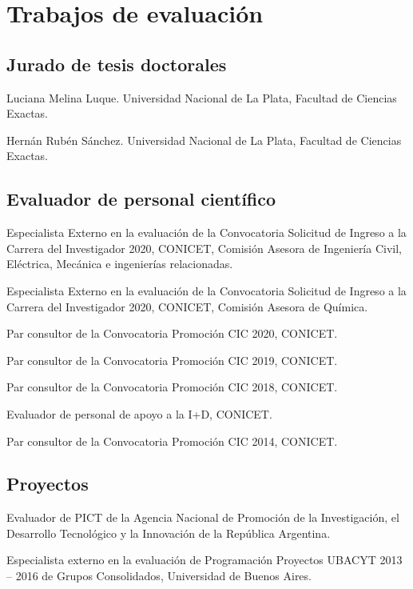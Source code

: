 \section{Trabajos de evaluación}

\subsection{Jurado de tesis doctorales}
 Luciana Melina Luque. Universidad Nacional de La Plata, Facultad de Ciencias Exactas.

 Hernán Rubén Sánchez. Universidad Nacional de La Plata, Facultad de Ciencias Exactas.

\subsection{Evaluador de personal científico}

 Especialista Externo en la evaluación de la Convocatoria Solicitud de Ingreso a la Carrera del Investigador 2020, CONICET,
 Comisión Asesora de Ingeniería Civil, Eléctrica, Mecánica e ingenierías relacionadas.

 Especialista Externo en la evaluación de la Convocatoria Solicitud de Ingreso a la Carrera del Investigador 2020, CONICET, 
Comisión Asesora de Química.

 Par consultor de la Convocatoria Promoción CIC 2020, CONICET.

 Par consultor de la Convocatoria Promoción CIC 2019, CONICET.

 Par consultor de la Convocatoria Promoción CIC 2018, CONICET.

 Evaluador de personal de apoyo a la I+D, CONICET.

 Par consultor de la Convocatoria Promoción CIC 2014, CONICET.

\subsection{Proyectos}
 Evaluador de PICT de la Agencia Nacional de Promoción de la Investigación, el Desarrollo Tecnológico y la Innovación de la República Argentina.

 Especialista externo en la evaluación de Programación Proyectos UBACYT 2013 -- 2016 de Grupos Consolidados, Universidad de Buenos Aires.

